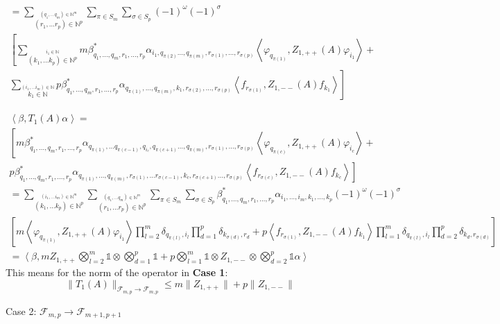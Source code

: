 \documentclass[a4paper,12pt]{article}
\begin{document}
\begin{multline}
=\sum_{\stackrel{(q_1,\dots q_m)\in \mathbb{N}^m}{(r_1,\dots r_p)\in \mathbb{N}^p}} \sum_{\pi \in S_m} \sum_{\sigma \in S_p}  (-1)^\omega (-1)^\sigma \\
\left[ \sum_{\stackrel{i_1\in \mathbb{N}}{(k_1,\dots k_p)\in \mathbb{N}^p}} m \beta^*_{q_1,\dots, q_m, r_1, \dots, r_p} \alpha_{ i_1,q_{\pi(2)} \dots, q_{\pi(m)}, r_{\sigma(1)}, \dots, r_{\sigma(p)}} \left<\varphi_{q_{\pi(1)}} ,Z_{1,++}(A) \varphi_{i_1}\right>  +\right.\\
\left.\sum_{\stackrel{(i_1,\dots i_m)\in \mathbb{N}}{k_1\in \mathbb{N}}}  p \beta^*_{q_1,\dots, q_m, r_1, \dots, r_p} \alpha_{q_{\pi(1)},\dots, q_{\pi(m)}, k_{1},  r_{\sigma(2)}, \dots, r_{\sigma(p)}} \left<f_{r_{\sigma(1)}},Z_{1,--}(A)f_{k_1}\right> \right]
\end{multline}

\begin{multline}
\left<\beta\right., T_1(A) \left.\alpha\right>=\\
\left[m \beta^*_{q_1,\dots, q_m, r_1, \dots, r_p} \alpha_{q_{\pi(1)},\dots q_{\pi(c-1)}, q_{i_c},q_{\pi(c+1)} \dots, q_{\pi(m)}, r_{\sigma(1)}, \dots, r_{\sigma(p)}} \left<\varphi_{q_{\pi(c)}} ,Z_{1,++}(A) \varphi_{i_c}\right>  +\right.\\
\left. p \beta^*_{q_1,\dots, q_m, r_1, \dots, r_p} \alpha_{q_{\pi(1)},\dots, q_{\pi(m)}, r_{\sigma(1)}, \dots r_{\sigma(c-1)}, k_{c},r_{\sigma(c+1)} \dots, r_{\sigma(p)}} \left<f_{r_{\sigma(c)}},Z_{1,--}(A)f_{k_c}\right> \right]\\
=\sum_{\stackrel{(i_1,\dots i_m)\in \mathbb{N}^m}{(k_1,\dots k_p)\in \mathbb{N}^p}}\sum_{\stackrel{(q_1,\dots q_m)\in \mathbb{N}^m}{(r_1,\dots r_p)\in \mathbb{N}^p}} \sum_{\pi \in S_m} \sum_{\sigma \in S_p} \beta^*_{q_1,\dots, q_m, r_1, \dots, r_p}  \alpha_{i_1,\dots, i_m, k_1, \dots, k_p} (-1)^\omega (-1)^\sigma \\
\left[m \left<\varphi_{q_{\pi(1)}} ,Z_{1,++}(A) \varphi_{i_1}\right> \prod_{l=2}^m   \delta_{q_{\pi(l)},i_l} \prod_{d=1}^p \delta_{k_{\sigma(d)},r_d} +
p \left<f_{r_{\sigma(1)}},Z_{1,--}(A)f_{k_1}\right> \prod_{l=1}^m   \delta_{q_{\pi(l)},i_l} \prod_{d=2}^p \delta_{k_{d},r_{\sigma(d)}} \right]\\
=\left<\beta\right., m Z_{1,++}\bigotimes_{l=2}^m \mathds{1} \otimes \bigotimes_{d=1}^p \mathds{1}+p \bigotimes_{l=1}^m \mathds{1} \otimes Z_{1,--} \otimes \bigotimes_{d=2}^p \mathds{1} \left.\alpha\right>
\end{multline}
This means for the norm of the operator in {\bf Case 1}:
\begin{equation}
\| T_1(A)\|_{\mathcal{F}_{m,p}\rightarrow \mathcal{F}_{m,p} }\le m \|Z_{1,++}\|+p \|Z_{1,--}\|
\end{equation}
\vspace{1cm}
\begin{center}
{\Large Case 2:} \( \mathcal{F}_{m,p}\rightarrow \mathcal{F}_{m+1,p+1} \)
\end{center}
\end{document}
